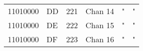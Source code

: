 \begin{center}
\begin{supertabular}{| C{2cm} | C{1.5cm} | C{1.5cm} | C{5.3cm} | C{1.5cm} | C{1.5cm} |}
                11010000 & DD & 221 & Chan 14  &                              "                    &                    "                        \\
             11010000 & DE & 222 & Chan 15  &                              "                    &                    "                        \\
                11010000 & DF & 223 & Chan 16  &                              "                    &                    "                        \\
        \end{supertabular}
        \end{center}


